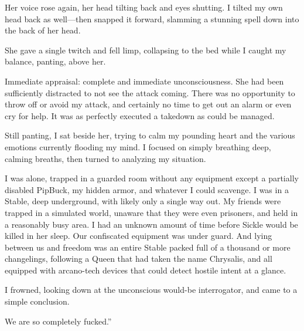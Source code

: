 Her voice rose again, her head tilting back and eyes shutting. I tilted my own head back as well—then snapped it forward, slamming a stunning spell down into the back of her head.

She gave a single twitch and fell limp, collapsing to the bed while I caught my balance, panting, above her.

Immediate appraisal: complete and immediate unconsciousness. She had been sufficiently distracted to not see the attack coming. There was no opportunity to throw off or avoid my attack, and certainly no time to get out an alarm or even cry for help. It was as perfectly executed a takedown as could be managed.

Still panting, I sat beside her, trying to calm my pounding heart and the various emotions currently flooding my mind. I focused on simply breathing deep, calming breaths, then turned to analyzing my situation.

I was alone, trapped in a guarded room without any equipment except a partially disabled PipBuck, my hidden armor, and whatever I could scavenge. I was in a Stable, deep underground, with likely only a single way out. My friends were trapped in a simulated world, unaware that they were even prisoners, and held in a reasonably busy area. I had an unknown amount of time before Sickle would be killed in her sleep. Our confiscated equipment was under guard. And lying between us and freedom was an entire Stable packed full of a thousand or more changelings, following a Queen that had taken the name Chrysalis, and all equipped with arcano-tech devices that could detect hostile intent at a glance.

I frowned, looking down at the unconscious would-be interrogator, and came to a simple conclusion.

\leavevmode{}We are so completely fucked.”